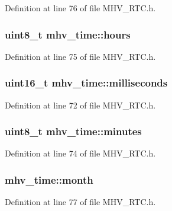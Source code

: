 Definition at line 76 of file M\-H\-V\-\_\-\-R\-T\-C.\-h.

\hypertarget{structmhv__time_a86216ab6b58bede2c74b8b38745c81f7}{
\subsubsection[{hours}]{\setlength{\rightskip}{0pt plus 5cm}uint8\-\_\-t mhv\-\_\-time\-::hours}}\label{structmhv__time_a86216ab6b58bede2c74b8b38745c81f7}


Definition at line 75 of file M\-H\-V\-\_\-\-R\-T\-C.\-h.

\hypertarget{structmhv__time_a88f1e6b1d010c2f21b11bd335b1fae65}{
\subsubsection[{milliseconds}]{\setlength{\rightskip}{0pt plus 5cm}uint16\-\_\-t mhv\-\_\-time\-::milliseconds}}\label{structmhv__time_a88f1e6b1d010c2f21b11bd335b1fae65}


Definition at line 72 of file M\-H\-V\-\_\-\-R\-T\-C.\-h.

\hypertarget{structmhv__time_a72c1e9925d2d3de254c6550c0b309347}{
\subsubsection[{minutes}]{\setlength{\rightskip}{0pt plus 5cm}uint8\-\_\-t mhv\-\_\-time\-::minutes}}\label{structmhv__time_a72c1e9925d2d3de254c6550c0b309347}


Definition at line 74 of file M\-H\-V\-\_\-\-R\-T\-C.\-h.

\hypertarget{structmhv__time_a832c57e459789022fb39b7c704a3e926}{
\subsubsection[{month}]{ mhv\-\_\-time\-::month}}\label{structmhv__time_a832c57e459789022fb39b7c704a3e926}


Definition at line 77 of file M\-H\-V\-\_\-\-R\-T\-C.\-h.

